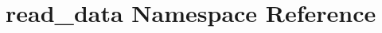 \hypertarget{namespaceread__data}{\section{read\-\_\-data Namespace Reference}
\label{namespaceread__data}
}
